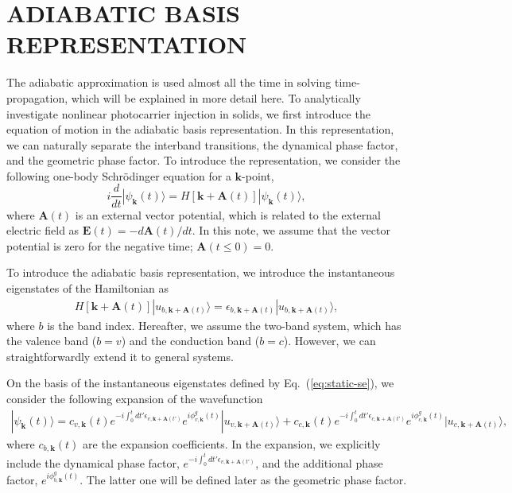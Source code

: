 \chapter{ADIABATIC BASIS REPRESENTATION \label{ch:A_ADIABATIC}}
\label{ch:Adiabatic}
The adiabatic approximation is used almost all the time in solving time-propagation, which will be
explained in more detail here.
To analytically investigate nonlinear photocarrier injection in solids, we first introduce the equation of motion in the adiabatic basis representation. In this representation, we can naturally separate the interband transitions, the dynamical phase factor, and the geometric phase factor. To introduce the representation, we consider the following one-body Schr\"odinger equation for a $\mathbf k$-point,
\begin{equation}
	i \frac{d}{dt} | \psi_{\mathbf k}(t) \rangle = H \left [\mathbf k + \mathbf A(t) \right ] | \psi_{\mathbf k}(t) \rangle,
	\label{eqn:tdse00}
\end{equation}
where $\mathbf A(t)$ is an external vector potential, which is related to the external electric field as $\mathbf E(t)=-d\mathbf A(t)/dt$. In this note, we assume that the vector potential is zero for the negative time; $\mathbf A(t\leq 0)=0$.

To introduce the adiabatic basis representation, we introduce the instantaneous eigenstates of the Hamiltonian as
\begin{align}
	H\left [\mathbf k + \mathbf A(t) \right ] |u_{b,\mathbf k+\mathbf A(t)}\rangle = \epsilon_{b,\mathbf k + \mathbf A(t)}|u_{b,\mathbf k+\mathbf A(t)}\rangle,
	\label{eq:static-se}
\end{align}
where $b$ is the band index. Hereafter, we assume the two-band system, which has the valence band ($b=v$) and the conduction band ($b=c$). However, we can straightforwardly extend it to general systems.

On the basis of the instantaneous eigenstates defined by Eq.~(\ref{eq:static-se}), we consider the following expansion of the wavefunction
\begin{align}
	|\psi_{\mathbf k}(t)\rangle = c_{v,\mathbf k}(t) e^{-i\int^t_0dt' \epsilon_{v,\mathbf k+ \mathbf A(t')}} e^{i\phi^g_{v,\mathbf k}(t)} |u_{v,\mathbf k+\mathbf A(t)}\rangle
	+c_{c,\mathbf k}(t) e^{-i\int^t_0dt' \epsilon_{c,\mathbf k+ \mathbf A(t')}} e^{i\phi^g_{c,\mathbf k}(t)} |u_{c,\mathbf k+\mathbf A(t)}\rangle,
	\label{eq:ansatz}
\end{align}
where $c_{b,\mathbf k}(t)$ are the expansion coefficients. In the expansion, we explicitly include the dynamical phase factor, $e^{-i\int^t_0dt' \epsilon_{v,\mathbf k+ \mathbf A(t')}}$, and the additional phase factor, $e^{i\phi^g_{b,\mathbf k}(t)}$. The latter one will be defined later as the geometric phase factor.

